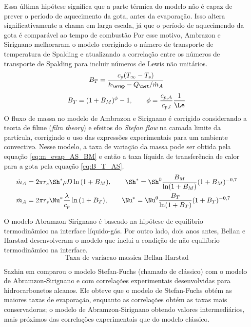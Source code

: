 Essa última hipótese significa que a parte térmica do modelo não é capaz de prever o período de aquecimento da gota, antes da evaporação.
Isso altera significativamente a chama em larga escala, já que o período de aquecimendo da gota é comparável ao tempo de combustão  
Por esse motivo, Ambrazon e Sirignano \cite{Sirignano1989} melhoraram o modelo corrigindo o número de transporte de temperatura de Spalding
e atualizando a correlação entre os números de transporte de Spalding para incluir números de Lewis não unitários.
\begin{equation}
    B_T = \frac{c_p (T_\infty - T_s)}{h_\evap - Q_{\net}/\dot m_A} \label{eq:B_T_AS}
\end{equation}
\begin{equation}
    B_T = (1 + B_M)^\phi - 1,
    \qquad
    \phi=\frac{c_{p,A}}{c_{p,l}}\frac{1}{\Le}
    \label{eq:B_M_B_T}
\end{equation}
O fluxo de massa no modelo de Ambrazon e Sirignano é corrigido considerando a teoria de filme (\emph{film theory}) e efeitos do \emph{Stefan flow} na camada limite da partícula, corrigindo o uso das expressões experimentais para um ambiente convectivo.
Nesse modelo, a taxa de variação da massa pode ser obtida pela equação \eqref{eq:m_evap_AS_BM} e então a taxa líquida de transferência de calor para a gota pela equação \eqref{eq:B_T_AS}.
\begin{align}
\dot m_{A} &= 2 \pi r_s \Sh^* \rho D \ln{(1 + B_M)}              
,\qquad
\Sh^* = \Sh^0 \frac{B_M}{\ln (1 + B_M)} (1 + B_M)^{-0,7} \label{eq:m_evap_AS_BM}
\\
\dot m_A   &= 2 \pi r_s \Nu^* \frac{\lambda}{c_p} \ln{(1 + B_T)} 
,\qquad
\Nu^* = \Nu^0 \frac{B_T}{\ln (1 + B_T)} (1 + B_T)^{-0,7} \label{eq:m_evap_AS_BT}
\end{align}

O modelo Abramzon-Sirignano é baseado na hipótese de equilíbrio termodinâmico na interface líquido-gás.
Por outro lado, dois anos antes, Bellan e Harstad  desenvolveram o modelo que inclui a condição de não equilíbrio termodinâmico na interface.
\begin{equation}
    \text{Taxa de variacao massica Bellan-Harstad}
\end{equation}


Sazhin em \cite{Sazhin2006} comparou o modelo Stefan-Fuchs (chamado de clássico) com o modelo de Abramzon-Sirignano e com correlações experimentais desenvolvidas para hidrocarbonetos alcanos.
Ele obteve que o modelo de Stefan-Fuchs obtém as maiores taxas de evaporação, enquanto as correlações obtém as taxas mais conservadoras; o modelo de Abramzon-Sirignano obtendo valores intermediários, mais próximos das correlações experimentais que do modelo clássico.

